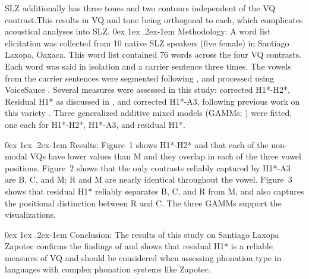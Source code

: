 \documentclass[12pt, letterpaper]{article}
\makeatletter
\renewcommand{\paragraph}{%
  \@startsection{paragraph}{4}%
  {\z@}{0ex \@plus 1ex \@minus .2ex}{-1em}%
  {\normalfont\normalsize\bfseries\itshape}%
}
\makeatother
\begin{document}
SLZ additionally has three tones and two contours independent of the VQ contrast.This results in VQ and tone being orthogonal to each, which complicates acoustical analyses into SLZ.  
\paragraph{Methodology:} A word list elicitation was collected from 10 native SLZ speakers (five female) in Santiago Laxopa, Oaxaca. This word list contained 76 words across the four VQ contrasts. Each word was said in isolation and a carrier sentence three times. The vowels from the carrier sentences were segmented following \citet{garellekAcousticDiscriminabilityComplex2020}, and processed using VoiceSauce \citep{shueVOICESAUCEProgramVoice2009}. Several measures were assessed in this study: corrected H1*-H2*, Residual H1* as discussed in \citet{chaiH1H2Acoustic2022}, and corrected H1*-A3, following previous work on this variety \citep{adlerAcousticsPhonationTypes2016}.  Three generalized additive mixed models (GAMMs; \cite{hastieGeneralizedAdditiveModels1986}) were fitted, one each for H1*-H2*, H1*-A3, and residual H1*.

\paragraph{Results:} Figure~1 shows H1*-H2* and that each of the non-modal VQs have lower values than M and they overlap in each of the three vowel positions. Figure~2 shows that the only contrasts reliably captured by H1*-A3 are B, C, and M; R and M are nearly identical throughout the vowel. Figure~3 shows that residual H1* reliably separates B, C, and R from M, and also captures the positional distinction between R and C. The three GAMMs support the visualizations.

\paragraph{Conclusion:} The results of this study on Santiago Laxopa Zapotec confirms the findings of \citet{brinkerhoffResidualH1Measure2024} and shows that residual H1* is a reliable measures of VQ and should be considered when assessing phonation type in languages with complex phonation systems like Zapotec.
\end{document}
